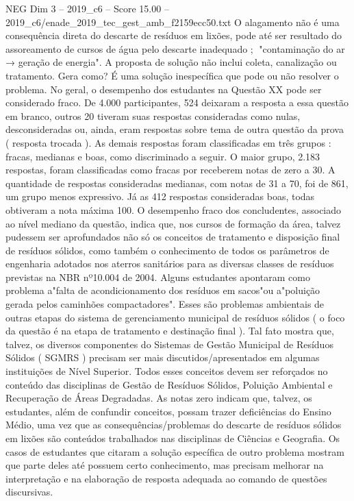 \begin{textsample}{NEG Dim 3 – 2019\_c6 – Score 15.00 – 2019\_c6/enade\_2019\_tec\_gest\_amb\_f2159ecc50.txt}
O alagamento não é uma consequência direta do descarte de resíduos em lixões, pode até ser resultado do assoreamento de cursos de água pelo descarte inadequado ; "contaminação do ar → geração de energia".
A proposta de solução não inclui coleta, canalização ou tratamento.
Gera como?
É uma solução inespecífica que pode ou não resolver o problema.
No geral, o desempenho dos estudantes na Questão XX pode ser considerado fraco.
De 4.000 participantes, 524 deixaram a resposta a essa questão em branco, outros 20 tiveram suas respostas consideradas como nulas, desconsideradas ou, ainda, eram respostas sobre tema de outra questão da prova ( resposta trocada ).
As demais respostas foram classificadas em três grupos : fracas, medianas e boas, como discriminado a seguir.
O maior grupo, 2.183 respostas, foram classificadas como fracas por receberem notas de zero a 30.
A quantidade de respostas consideradas medianas, com notas de 31 a 70, foi de 861, um grupo menos expressivo.
Já as 412 respostas consideradas boas, todas obtiveram a nota máxima 100.
O desempenho fraco dos concludentes, associado ao nível mediano da questão, indica que, nos cursos de formação da área, talvez pudessem ser aprofundados não só os conceitos de tratamento e disposição final de resíduos sólidos, como também o conhecimento de todos os parâmetros de engenharia adotados nos aterros sanitários para as diversas classes de resíduos previstas na NBR nº10.004 de 2004.
Alguns estudantes apontaram como problema a"falta de acondicionamento dos resíduos em sacos"ou a"poluição gerada pelos caminhões compactadores".
Esses são problemas ambientais de outras etapas do sistema de gerenciamento municipal de resíduos sólidos ( o foco da questão é na etapa de tratamento e destinação final ).
Tal fato mostra que, talvez, os diversos componentes do Sistemas de Gestão Municipal de Resíduos Sólidos ( SGMRS ) precisam ser mais discutidos/apresentados em algumas instituições de Nível Superior.
Todos esses conceitos devem ser reforçados no conteúdo das disciplinas de Gestão de Resíduos Sólidos, Poluição Ambiental e Recuperação de Áreas Degradadas.
As notas zero indicam que, talvez, os estudantes, além de confundir conceitos, possam trazer deficiências do Ensino Médio, uma vez que as consequências/problemas do descarte de resíduos sólidos em lixões são conteúdos trabalhados nas disciplinas de Ciências e Geografia.
Os casos de estudantes que citaram a solução específica de outro problema mostram que parte deles até possuem certo conhecimento, mas precisam melhorar na interpretação e na elaboração de resposta adequada ao comando de questões discursivas.

\end{textsample}
